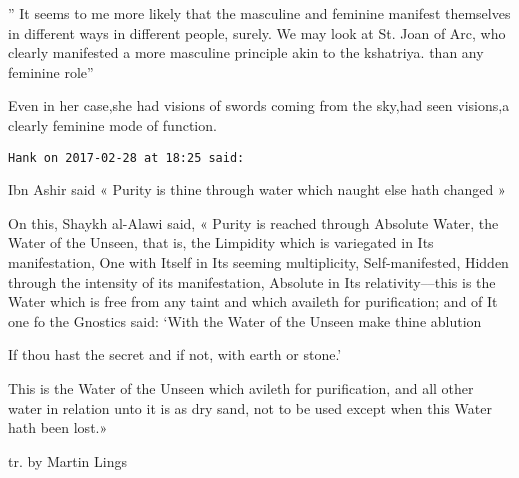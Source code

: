 \begin{footnotesize}
\begin{sffamily}
” It seems to me more likely that the masculine and feminine manifest themselves in different ways in different people, surely. We may look at St. Joan of Arc, who clearly manifested a more masculine principle akin to the kshatriya. than any feminine role”

Even in her case,she had visions of swords coming from the sky,had seen visions,a clearly feminine mode of function.


\hfill

\texttt{Hank on 2017-02-28 at 18:25 said: }

Ibn Ashir said « Purity is thine through water which naught else hath changed »

On this, Shaykh al-Alawi said, « Purity is reached through Absolute Water, the Water of the Unseen, that is, the Limpidity which is variegated in Its manifestation, One with Itself in Its seeming multiplicity, Self-manifested, Hidden through the intensity of its manifestation, Absolute in Its relativity––this is the Water which is free from any taint and which availeth for purification; and of It one fo the Gnostics said: `With the Water of the Unseen make thine ablution

If thou hast the secret and if not, with earth or stone.' 

This is the Water of the Unseen which avileth for purification, and all other water in relation unto it is as dry sand, not to be used except when this Water hath been lost.»

tr. by Martin Lings


\end{sffamily}\end{footnotesize}
